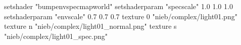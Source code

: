 setshader "bumpenvspecmapworld"
setshaderparam "specscale" 1.0 1.0 1.0
setshaderparam "envscale"  0.7 0.7 0.7
    texture 0 "nieb/complex/light01.png"
    texture n "nieb/complex/light01_normal.png"
    texture s "nieb/complex/light01_spec.png"